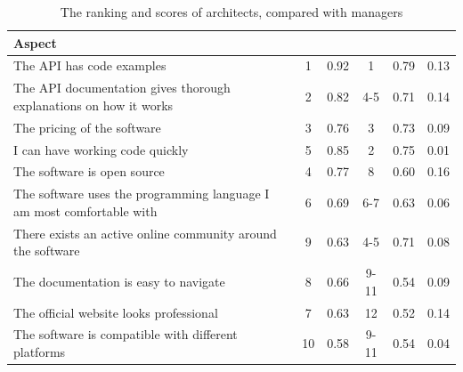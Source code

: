 \documentclass{cslthse-msc}
\begin{document}
    \begin{table}[H]
        \centering
        \caption{The ranking and scores of architects, compared with managers}
        \label{tab:arch-man}
        \begin{tabularx}{\columnwidth}{X|c:c|c:c|c}

            \textbf{Aspect}                                                    &     & &   & & \\ \hline
            The API has code examples                                             &         1 & 0.92       &            1 & 0.79           & 0.13  \\ \hline
            The API documentation gives thorough explanations on how it works     &         2 & 0.82       &          4-5 & 0.71           & 0.14  \\ \hline
            The pricing of the software                                           &         3 & 0.76       &            3 & 0.73           & 0.09  \\ \hline
            I can have working code quickly                                       &         5 & 0.85       &            2 & 0.75           & 0.01  \\ \hline
            The software is open source                                           &         4 & 0.77       &            8 & 0.60           & 0.16  \\ \hline
            The software uses the programming language I am most comfortable with &         6 & 0.69       &          6-7 & 0.63           & 0.06  \\ \hline
            There exists an active online community around the software           &         9 & 0.63       &          4-5 & 0.71           & 0.08  \\ \hline
            The documentation is easy to navigate                                 &         8 & 0.66       &         9-11 & 0.54           & 0.09  \\ \hline
            The official website looks professional                               &         7 & 0.63       &           12 & 0.52           & 0.14  \\ \hline
            The software is compatible with different platforms                   &        10 & 0.58       &         9-11 & 0.54           & 0.04  \\ \hline

\end{tabularx}
\end{table}
\end{document}
